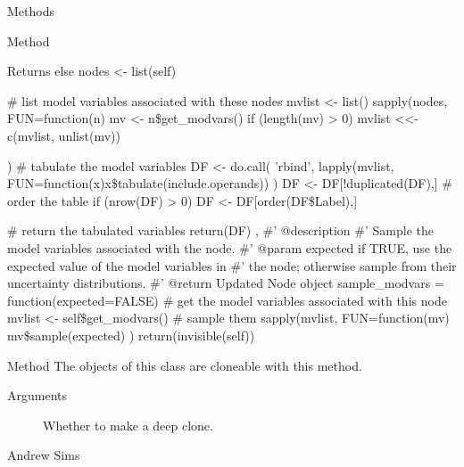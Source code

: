 \documentclass[a4paper]{book}
\begin{document}
\begin{Section}{Methods}
\begin{SubSection}{Method }
\begin{SubSubSection}{Returns}
else 
nodes <- list(self)

\# list model variables associated with these nodes
mvlist <- list()
sapply(nodes, FUN=function(n) 
mv <- n\$get\_modvars()
if (length(mv) > 0) 
mvlist <<- c(mvlist, unlist(mv))

)
\# tabulate the model variables
DF <- do.call(
'rbind', 
lapply(mvlist, FUN=function(x)x\$tabulate(include.operands))
)
DF <- DF[!duplicated(DF),]
\# order the table
if (nrow(DF) > 0) 
DF <- DF[order(DF\$Label),]

\# return the tabulated variables
return(DF)
,
\#' @description 
\#' Sample the model variables associated with the node.
\#' @param expected if TRUE, use the expected value of the model variables in
\#'        the node; otherwise sample from their uncertainty distributions.
\#' @return Updated Node object
sample\_modvars = function(expected=FALSE) 
\# get the model variables associated with this node
mvlist <- self\$get\_modvars()
\# sample them
sapply(mvlist, FUN=function(mv) 
mv\$sample(expected)
)
return(invisible(self))

\end{SubSubSection}

\end{SubSection}



\hypertarget{method-clone}{}
%
\begin{SubSection}{Method }
The objects of this class are cloneable with this method.
%


%
\begin{SubSubSection}{Arguments}

\begin{description}

\item[] Whether to make a deep clone.

\end{description}


\end{SubSubSection}

\end{SubSection}

\end{Section}
%
\begin{Author}\relax
Andrew Sims 
\end{Author}
\end{document}
